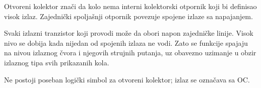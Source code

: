 Otvoreni kolektor znači da kolo nema interni kolektorski otpornik koji bi definisao visok izlaz. Zajednički spoljašnji otpornik povezuje spojene izlaze sa napajanjem.

Svaki izlazni tranzistor koji provodi može da obori napon zajedničke linije. Visok nivo se dobija kada nijedan od spojenih izlaza ne vodi. Zato se funkcije spajaju na nivou izlaznog čvora i njegovih strujnih putanja, uz obavezno uzimanje u obzir izlaznog tipa svih prikazanih kola.

Ne postoji poseban logički simbol za otvoreni kolektor; izlaz se označava sa OC.
